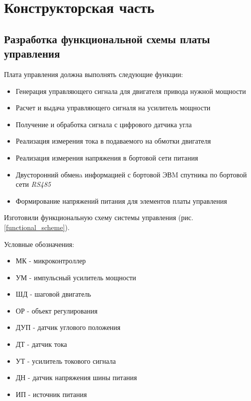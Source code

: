 \clearpage
\section{Конструкторская часть}

\subsection{Разработка функциональной схемы платы управления}
Плата управления должна выполнять следующие функции:
\begin{itemize}
    \item Генерация управляющего сигнала для двигателя привода нужной мощности
    \item Расчет и выдача управляющего сигналя на усилитель мощности
    \item Получение и обработка сигнала с цифрового датчика угла
    \item Реализация измерения тока в подаваемого на обмотки двигателя
    \item Реализация измерения напряжения в бортовой сети питания
    \item Двусторонний обменa информацией с бортовой ЭВM спутника по бортовой
            сети \textit{RS485}
    \item Формирование напряжений питания для элементов платы управления
\end{itemize}

Изготовили функциональную схему системы управления
(рис. \ref{functional_scheme}).

Условные обозначения:
\begin{itemize}
    \item МК - микроконтроллер
    \item УМ - импульсный усилитель мощности
    \item ШД - шаговой двигатель
    \item ОР - объект регулирования
    \item ДУП - датчик углового положения
    \item ДТ - датчик тока
    \item УТ - усилитель токового сигнала
    \item ДН - датчик напряжения шины питания
    \item ИП - источник питания
\end{itemize}

